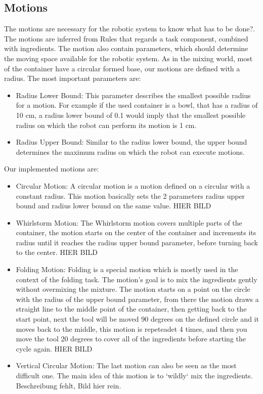 \subsection*{Motions}
The motions are necessary for the robotic system to know what has to be done?. The motions are inferred from Rules that regards a task component, combined with ingredients.
The motion also contain parameters, which should determine the moving space available for the robotic system. As in the mixing world, most of the container have a circular formed base, our motions are defined with a radius.
The most important parameters are:
\begin{itemize}
    \item Radius Lower Bound: This parameter describes the smallest possible radius for a motion. For example if the used container is a bowl, that has a radius of 10 cm, a radius lower bound of 0.1 would imply that the smallest possible radius on which the robot can perform its motion is 1 cm.
    \item Radius Upper Bound: Similar to the radius lower bound, the upper bound determines the maximum radius on which the robot can execute motions.
\end{itemize}
Our implemented motions are:
\begin{itemize}
    \item Circular Motion: A circular motion is a motion defined on a circular with a constant radius. This motion basically sets the 2 parameters radius upper bound and radius lower bound on the same value.  \newline HIER BILD
    \item Whirlstorm Motion: The Whirlstorm motion covers multiple parts of the container, the motion starts on the center of the container and increments its radius until it reaches the radius upper bound parameter, before turning back to the center. \newline HIER BILD
    \item Folding Motion: Folding is a special motion which is mostly used in the context of the folding task. The motion's goal is to mix the ingredients gently without overmixing the mixture. The motion starts on a point on the circle with the radius of the upper bound parameter, from there the motion draws a straight line to the middle point of the container, then getting back to the start point, next the tool will be moved 90 degrees on the defined circle and it moves back to the middle, this motion is repeteadet 4 times, and then you move the tool 20 degrees to cover all of the ingredients before starting the cycle again. \newline HIER BILD
    \item Vertical Circular Motion: The last motion can also be seen as the most difficult one. The main idea of this motion is to `wildly` mix the ingredients. Beschreibung fehlt, Bild hier rein.
\end{itemize}

